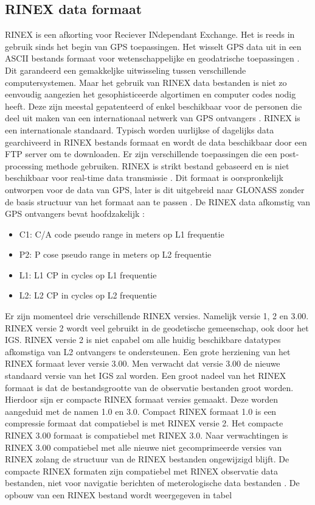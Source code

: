 \subsection{RINEX data formaat}
\label{LRin}
RINEX is een afkorting voor Reciever INdependant Exchange. Het is reeds in gebruik sinds het begin van GPS toepassingen. Het wisselt GPS data uit in een ASCII bestands formaat voor wetenschappelijke en geodatrische toepassingen \cite{LBibRTCM}. Dit garandeerd een gemakkeljke uitwisseling tussen verschillende computersystemen. Maar het gebruik van RINEX data bestanden is niet zo eenvoudig aangezien het gesophisticeerde algortimen en computer codes nodig heeft. Deze zijn meestal gepatenteerd of enkel beschikbaar voor de personen die deel uit maken van een internationaal netwerk van GPS ontvangers \cite{LBibGPS5}. RINEX is een internationale standaard. Typisch worden uurlijkse of dagelijks data gearchiveerd in RINEX bestands formaat en wordt de data beschikbaar door een FTP server om te downloaden. Er zijn verschillende toepassingen die een post-processing methode gebruiken. RINEX is strikt bestand gebaseerd en is niet beschikbaar voor real-time data transmissie \cite{LBibRTCM}. Dit formaat is oorspronkelijk ontworpen voor de data van GPS, later is dit uitgebreid naar GLONASS zonder de basis structuur van het formaat aan te passen \cite{LBibRINEX}. De RINEX data afkomstig van GPS ontvangers bevat hoofdzakelijk \cite{LBibGPS5}:
\begin{itemize}
	\item C1: C/A code pseudo range in meters op L1 frequentie
	\item P2: P cose pseudo range in meters op L2 frequentie
	\item L1: L1 CP in cycles op L1 frequentie
	\item L2: L2 CP in cycles op L2 frequentie
\end{itemize}
 Er zijn momenteel drie verschillende RINEX versies. Namelijk versie 1, 2 en 3.00. RINEX versie  2 wordt veel gebruikt in de geodetische gemeenschap, ook door het IGS. RINEX versie 2 is niet capabel om alle huidig beschikbare datatypes afkomstiga van L2 ontvangers te ondersteunen. Een grote herziening van het RINEX formaat lever versie 3.00. Men verwacht dat versie 3.00 de nieuwe standaard versie van het IGS zal worden. Een groot nadeel van het RINEX formaat is dat de bestandsgrootte van de observatie bestanden groot worden. Hierdoor sijn er compacte RINEX formaat versies gemaakt. Deze worden aangeduid met de namen 1.0 en 3.0. Compact RINEX formaat 1.0 is een compressie formaat dat compatiebel is met RINEX versie 2. Het compacte RINEX 3.00 formaat is compatiebel met RINEX 3.0. Naar verwachtingen is RINEX 3.00 compatiebel met alle nieuwe niet gecomprimeerde versies van RINEX zolang de structuur van de RINEX bestanden ongewijzigd blijft.  De compacte RINEX formaten zijn compatiebel met RINEX observatie data bestanden, niet voor navigatie berichten of meterologische data bestanden \cite{LBibRINEX}. De opbouw van een RINEX bestand wordt weergegeven in tabel
